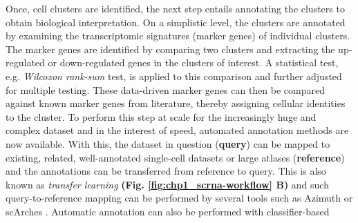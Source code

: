 \par Once, cell clusters are identified, the next step entails annotating the clusters to obtain biological interpretation. %
On a simplistic level, the clusters are annotated by examining the transcriptomic signatures (marker genes) of individual clusters. The marker genes are identified by comparing two clusters and extracting the up-regulated or down-regulated genes in the clusters of interest. A statistical test, e.g. \textit{Wilcoxon rank-sum} test, is applied to this comparison and further adjusted for multiple testing.  %
These data-driven marker genes can then be compared against known marker genes from literature, thereby assigning cellular identities to the cluster. To perform this step at scale for the increasingly huge and complex dataset and in the interest of speed, automated annotation methods are now available. With this, the dataset in question (\textbf{query}) can be mapped to existing, related, well-annotated single-cell datasets or large atlases (\textbf{reference}) and the annotations can be transferred from reference to query. This is also known as \textit{transfer learning} \textbf{(Fig. \ref{fig:chp1_scrna-workflow} B)} and such query-to-reference mapping can be performed by several tools such as Azimuth \textbf{\cite{hao_integrated_2021}} or scArches \textbf{\cite{lotfollahi_mapping_2021}}. Automatic annotation can also be performed with classifier-based 

